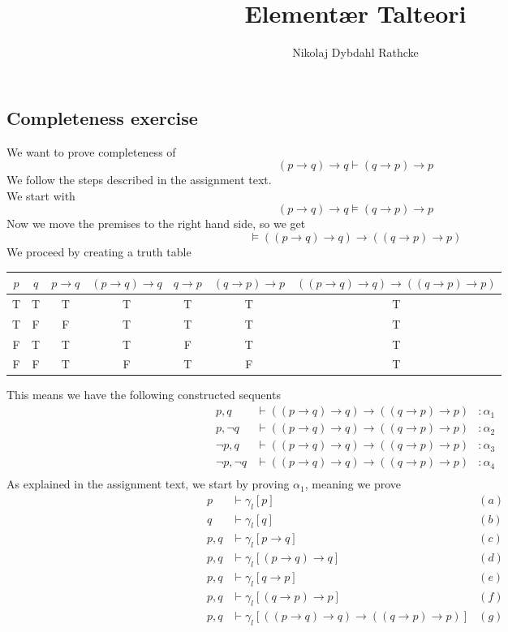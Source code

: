 \documentclass[12pt]{article}
\title{Elementær Talteori}
\author{Nikolaj Dybdahl Rathcke}
\begin{document}
\subsection*{Completeness exercise}
We want to prove completeness of
$$(p\to q)\to q \vdash (q\to p)\to p$$
We follow the steps described in the assignment text.\\
We start with
$$(p\to q)\to q \models (q\to p)\to p$$
Now we move the premises to the right hand side, so we get
$$\models ((p\to q)\to q)\to((q\to p)\to p)$$
We proceed by creating a truth table
\begin{center}
\begin{tabular}{|c|c||c|c|c|c||c|}
\hline 
$p$ & $q$ & $p\to q$ & $(p\to q)\to q$ & $q\to p$ & $(q\to p)\to p$ & $((p\to q)\to q)\to((q\to p)\to p)$ \\ 
\hline 
T & T & T & T & T & T & T \\ 
\hline 
T & F & F & T & T & T & T \\ 
\hline 
F & T & T & T & F & T & T \\ 
\hline 
F & F & T & F & T & F & T \\ 
\hline 
\end{tabular} 
\end{center}
This means we have the following constructed sequents
\begin{align*}
p,q&\vdash((p\to q)\to q)\to((q\to p)\to p) &:\alpha_1\\
p,\neg q&\vdash((p\to q)\to q)\to((q\to p)\to p) &:\alpha_2\\
\neg p,q&\vdash((p\to q)\to q)\to((q\to p)\to p) &:\alpha_3\\
\neg p,\neg q&\vdash((p\to q)\to q)\to((q\to p)\to p)&:\alpha_4 \\
\end{align*}
As explained in the assignment text, we start by proving $\alpha_1$, meaning we prove
\begin{align*}
p&\vdash \gamma_{\textit{l}}[p] &(a) \\
q&\vdash \gamma_{\textit{l}}[q] &(b)\\
p,q&\vdash \gamma_{\textit{l}}[p\to q]&(c)\\
p,q&\vdash \gamma_{\textit{l}}[(p\to q)\to q]&(d)\\
p,q&\vdash \gamma_{\textit{l}}[q\to p]&(e)\\
p,q&\vdash \gamma_{\textit{l}}[(q\to p)\to p]&(f)\\
p,q&\vdash \gamma_{\textit{l}}[((p\to q)\to q)\to((q\to p)\to p)]&(g)
\end{align*}
\end{document}
